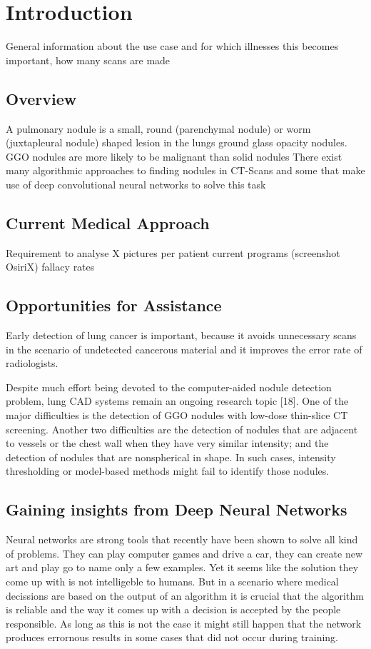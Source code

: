 \documentclass[main.tex]{subfiles}
\begin{document}
\chapter{Introduction}
General information about the use case and for which illnesses this becomes important, how many scans are made
\section{Overview}
 A pulmonary nodule is a small, round (parenchymal nodule) or worm (juxtapleural nodule) shaped lesion in the lungs
 ground glass opacity nodules.
 GGO nodules are more likely to be malignant than solid nodules
There exist many algorithmic approaches to finding nodules in CT-Scans \cite{papers_classical} and some that
make use of deep convolutional neural networks to solve this task \cite{papers_dnn}

\section{Current Medical Approach}
Requirement to analyse X pictures per patient
current programs (screenshot OsiriX)
fallacy rates

\section{Opportunities for Assistance}

Early detection of lung cancer is important, because it avoids unnecessary scans in the scenario
of undetected cancerous material and it improves the error rate of radiologists.

Despite much effort being devoted to the computer-aided nodule detection problem, lung CAD systems remain an ongoing
research topic [18]. One of the major difficulties is the detection of GGO nodules with low-dose thin-slice CT screening. Another two difficulties are the detection of nodules that are adjacent to vessels or the chest wall when they have very similar intensity; and the detection of nodules that are nonspherical in shape. In such cases, intensity thresholding or model-based methods might fail to identify those nodules.

\section{Gaining insights from Deep Neural Networks}
Neural networks are strong tools that recently have been shown to solve all kind of problems. They can play
computer games and drive a car, they can create new art and play go to name only a few examples. Yet it seems
like the solution they come up with is not intelligeble to humans. But
in a scenario where medical decissions are based on the output of an algorithm it is crucial that
the algorithm is reliable and the way it comes up with a decision is
accepted by the people responsible. As long as this is not the case it might still happen that
the network produces errornous results in some cases that did not occur during training.
\end{document}

